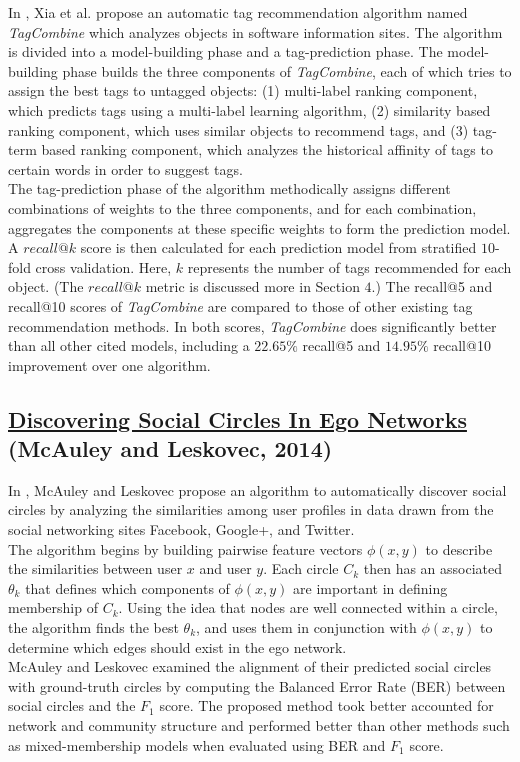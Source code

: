 \documentclass[11pt, final]{article}
\newcommand{\br}[1][.75]{\ \\[#1\baselineskip]}
\begin{document}
In \cite{1}, Xia et al. propose an automatic tag recommendation algorithm named \textit{TagCombine} which analyzes objects in software information sites. The algorithm is divided into a model-building phase and a tag-prediction phase. The model-building phase builds the three components of \textit{TagCombine}, each of which tries to assign the best tags to untagged objects: (1) multi-label ranking component, which predicts tags using a multi-label learning algorithm, (2) similarity based ranking component, which uses similar objects to recommend tags, and (3) tag-term based ranking component, which analyzes the historical affinity of tags to certain words in order to suggest tags.\br
The tag-prediction phase of the algorithm methodically assigns different combinations of weights to the three components, and for each combination, aggregates the components at these specific weights to form the prediction model. A $recall@k$ score is then calculated for each prediction model from stratified $10$-fold cross validation. Here, $k$ represents the number of tags recommended for each object. (The $recall@k$ metric is discussed more in Section $4$.) The recall@5 and recall@10 scores of \textit{TagCombine} are compared to those of other existing tag recommendation methods. In both scores, \textit{TagCombine} does significantly better than all other cited models, including a $22.65\%$ recall@5 and $14.95\%$ recall@10 improvement over one algorithm.

\subsection{\href{http://cs.stanford.edu/people/jure/pubs/circles-tkdd14.pdf}{Discovering Social Circles In Ego Networks} (McAuley and Leskovec, 2014)}

In \cite{2}, McAuley and Leskovec propose an algorithm to automatically discover social circles by analyzing the similarities among user profiles in data drawn from the social networking sites Facebook, Google+, and Twitter.\br
The algorithm begins by building pairwise feature vectors $\phi(x,y)$ to describe the similarities between user $x$ and user $y$. Each circle $C_k$ then has an associated $\theta_k$ that defines which components of $\phi(x,y)$ are important in defining membership of $C_k$. Using the idea that nodes are well connected within a circle, the algorithm finds the best $\theta_k$, and uses them in conjunction with $\phi(x,y)$ to determine which edges should exist in the ego network.\br
McAuley and Leskovec examined the alignment of their predicted social circles with ground-truth circles by computing the Balanced Error Rate (BER) between social circles and the $F_1$ score. The proposed method took better accounted for network and community structure and performed better than other methods such as mixed-membership models when evaluated using BER and $F_1$ score.
\end{document}
